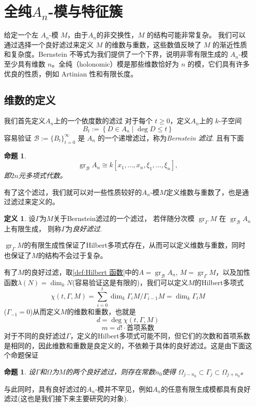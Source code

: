 \documentclass[11pt]{article}
\theoremstyle{plain}
\newtheorem{proposition}[theorem]{命题}
\theoremstyle{definition}
\newtheorem{definition}[theorem]{定义}
\theoremstyle{remark}
\newcommand{\gr}{\operatorname{gr}}
\begin{document}
\section{全纯$A_n$-模与特征簇}
给定一个左 $A_n$-模 $M$，由于$A_n$的非交换性，$M$ 的结构可能非常复杂。
我们可以通过选择一个良好滤过来定义 $M$ 的维数与重数，这些数值反映了 $M$ 的渐近性质和复杂度。Bernstein 不等式为我们提供了一个下界，说明非零有限生成的 $A_n$-模至少具有维数 $n$。全纯（holonomic）模是那些维数恰好为 $n$ 的模，它们具有许多优良的性质，例如 Artinian 性和有限长度。


\subsection{维数的定义}
我们首先定义$A_n$上的一个依度数的滤过
对于每个 $t\ge0$，定义$A_n$上的 $k$-子空间
\begin{equation*}
    B_t:=\left\{D\in A_n\mid \deg D\leq t\right\}
\end{equation*}
容易验证 $\mathcal{B}:=\{B_t\}_{t=0}^\infty$ 是 $A_n$ 的一个递增滤过，称为\emph{Bernstein 滤过}.
且有下面
\begin{proposition}
    \begin{equation*}
        \gr_{\mathcal{B}}A_n\cong k[x_1,\dots,x_n,\xi_1,\dots,\xi_n],
    \end{equation*}
    即$2n$元多项式代数。
\end{proposition}
有了这个滤过，我们就可以对一些性质较好的$A_n$-模$M$定义维数与重数了，也是通过滤过来定义的。


\begin{definition}
    设$\Gamma$为$M$关于Bernstein滤过的一个滤过，
    若伴随分次模 $\gr_\Gamma M$
    在 $\gr_{\mathcal{B}}A_n$ 上有限生成，
    则称$\Gamma$为\emph{良好滤过}.
\end{definition}
$\gr_{\Gamma}M$的有限生成性保证了Hilbert多项式存在，从而可以定义维数与重数，同时也保证了$M$的结构不会过于复杂。

有了$M$的良好过滤，取\ref{def:Hilbert 函数}中的$A=\gr_{\mathcal{B}}A_n$, $M=\gr_\Gamma M$，以及加性函数$\lambda(N)=\dim_k N$(容易验证这是有限的)，我们可以定义$M$的Hilbert多项式
\begin{equation*}
    \chi(t,\Gamma,M)=\sum_{i=0}^t \dim_k \Gamma_i M/\Gamma_{i-1} M
    =
    \dim_k \Gamma_t M
\end{equation*}
($\Gamma_{-1}=0$)从而定义$M$的维数和重数，也就是
\begin{equation*}
    d=\deg \chi(t,\Gamma,M)
\end{equation*}
\begin{equation*}
    m=d!\cdot \text{首项系数}
\end{equation*}
对于不同的良好滤过$\Gamma$，定义的Hilbert多项式可能不同，但它们的次数和首项系数是相同的，因此维数和重数是良定义的，不依赖于具体的良好滤过。这是由下面这个命题保证
\begin{proposition}
    设$\Gamma$和$\Omega$为$M$的两个良好滤过，则存在常数$n_0$使得
    $\Omega_{j-n_0}\subset\Gamma_j\subset \Omega_{j+n_0}$。
\end{proposition}
与此同时，具有良好滤过的$A_n$-模并不罕见，例如$A_n$的任意有限生成模都具有良好滤过(这也是我们接下来主要研究的对象).
\end{document}
